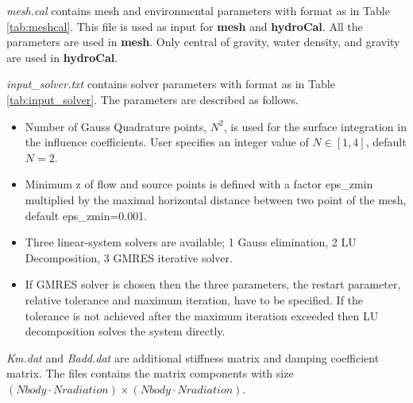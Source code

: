 \documentclass[12pt,a4paper,titlepage]{article}
\begin{document}
\emph{mesh.cal} contains mesh and environmental parameters with format as in Table \ref{tab:meshcal}. This file is used as input for \textbf{mesh} and \textbf{hydroCal}. All the parameters are used in \textbf{mesh}. Only central of gravity, water density, and gravity are used in \textbf{hydroCal}.

\emph{input\_solver.txt} contains solver parameters with format as in Table \ref{tab:input_solver}. The parameters are described as follows.
\begin{itemize}
\item  Number of Gauss Quadrature points, $N^2$, is used for the surface integration in the influence coefficients. User specifies an integer value of $N\in [1,4]$, default $N=2$.
\item Minimum z of flow and source points is defined with a factor  eps\_zmin multiplied by the maximal horizontal distance between two point of the mesh, default eps\_zmin=0.001.
\item Three linear-system solvers are available; 1 Gauss elimination, 2 LU Decomposition, 3 GMRES iterative solver.
\item If GMRES solver is chosen then the three parameters, the restart parameter, relative tolerance and maximum iteration, have to be specified. If the tolerance is not achieved after the maximum iteration exceeded then LU decomposition solves the system directly.
\end{itemize}

\emph{Km.dat} and \emph{Badd.dat} are additional stiffness matrix and damping coefficient matrix. The files contains the matrix components with size $(Nbody\cdot Nradiation)\times (Nbody\cdot Nradiation)$.
\end{document}
